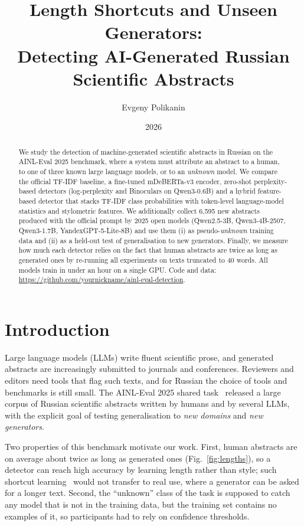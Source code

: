 \documentclass{article}
\title{Length Shortcuts and Unseen Generators:\\ Detecting AI-Generated Russian Scientific Abstracts}
\author{Evgeny Polikanin}
\date{2026}
\begin{document}
\maketitle
\begin{abstract}
We study the detection of machine-generated scientific abstracts in Russian on the AINL-Eval 2025 benchmark, where a system must attribute an abstract to a human, to one of three known large language models, or to an \emph{unknown} model. We compare the official TF-IDF baseline, a fine-tuned mDeBERTa-v3 encoder, zero-shot perplexity-based detectors (log-perplexity and Binoculars on Qwen3-0.6B) and a hybrid feature-based detector that stacks TF-IDF class probabilities with token-level language-model statistics and stylometric features. We additionally collect 6{,}595
new abstracts produced with the official prompt by 2025 open models (Qwen2.5-3B, Qwen3-4B-2507, Qwen3-1.7B, YandexGPT-5-Lite-8B) and use them (i) as pseudo-\emph{unknown} training data and (ii) as a held-out test of generalisation to new generators. Finally, we measure how much each detector relies on the fact that human abstracts are twice as long as generated ones by re-running all experiments on texts truncated to 40 words. All models train in under an hour on a single GPU.
Code and data: \url{https://github.com/yournickname/ainl-eval-detection}.
\end{abstract}



\section{Introduction}
Large language models (LLMs) write fluent scientific prose, and generated abstracts are increasingly submitted to journals and conferences. Reviewers and editors need tools that flag such texts, and for Russian the choice of tools and benchmarks is still small. The AINL-Eval 2025 shared task~\cite{ainleval2025} released a large corpus of Russian scientific abstracts written by humans and by several LLMs, with the explicit goal of testing generalisation to \emph{new domains} and \emph{new generators}.

Two properties of this benchmark motivate our work. First, human abstracts are on average about twice as long as generated ones (Fig.~\ref{fig:lengths}), so a detector can reach high accuracy by learning length rather than style; such shortcut learning~\cite{shortcut} would not transfer to real use, where a generator can be asked for a longer text. Second, the ``unknown'' class of the task is supposed to catch any model that is not in the training data, but the training set contains no examples of it, so participants had to rely on confidence thresholds.
\end{document}
